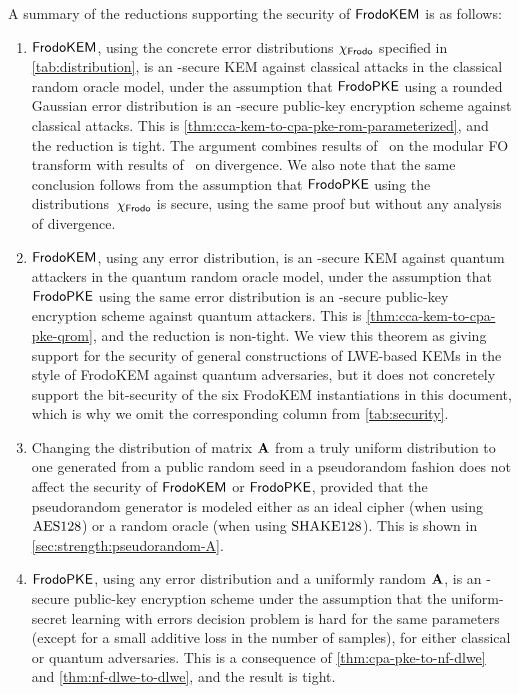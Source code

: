 \documentclass{iacrcc}
\begin{document}
A summary of the reductions supporting the security of $\textsf{\upshape\mdseries FrodoKEM}$ is
as follows:

\begin{enumerate}
\item $\textsf{\upshape\mdseries FrodoKEM}$, using the concrete error distributions
  $\chi_\textsf{\upshape\mdseries Frodo}$ specified in \autoref{tab:distribution}, is an
  \INDCCA-secure KEM against classical attacks in the classical random
  oracle model, under the assumption that $\textsf{\upshape\mdseries FrodoPKE}$ using a rounded
  Gaussian error distribution is an \INDCPA-secure public-key
  encryption scheme against classical attacks.  This is
  \autoref{thm:cca-kem-to-cpa-pke-rom-parameterized}, and the
  reduction is tight.  The argument combines results
  of~\cite{TCC:HofHovKil17} on the modular FO transform with results
  of~\cite{EC:LanSteSte14} on \renyi divergence. We also note that the
  same conclusion follows from the assumption that $\textsf{\upshape\mdseries FrodoPKE}$ using
  the distributions~$\chi_{\textsf{\upshape\mdseries Frodo}}$ is \INDCPA secure, using the same
  proof but without any analysis of \renyi divergence.

\item $\textsf{\upshape\mdseries FrodoKEM}$, using any error distribution, is an \INDCCA-secure
  KEM against quantum attackers in the quantum random oracle model,
  under the assumption that $\textsf{\upshape\mdseries FrodoPKE}$ using the same error
  distribution is an \OWCPA-secure public-key encryption scheme
  against quantum attackers.  This is
  \autoref{thm:cca-kem-to-cpa-pke-qrom}, and the reduction is
  non-tight.  We view this theorem as giving support for the security
  of general constructions of LWE-based KEMs in the style of FrodoKEM
  against quantum adversaries, but it does not concretely support the
  bit-security of the six FrodoKEM instantiations in this document,
  which is why we omit the corresponding column from
  \autoref{tab:security}.

\item Changing the distribution of matrix $\mathbf{A}$ from a truly uniform
  distribution to one generated from a public random seed in a
  pseudorandom fashion does not affect the security of $\textsf{\upshape\mdseries FrodoKEM}$ or
  $\textsf{\upshape\mdseries FrodoPKE}$, provided that the pseudorandom generator is modeled
  either as an ideal cipher (when using $\textrm{\upshape\mdseries AES128}$) or a random
  oracle (when using $\textrm{\upshape\mdseries SHAKE}128$). This is shown in
  \autoref{sec:strength:pseudorandom-A}.

\item $\textsf{\upshape\mdseries FrodoPKE}$, using any error distribution and a uniformly random
  $\mathbf{A}$, is an \INDCPA-secure public-key encryption scheme under the
  assumption that the uniform-secret learning with errors decision
  problem is hard for the same parameters (except for a small additive
  loss in the number of samples), for either classical or quantum
  adversaries.  This is a consequence of
  \autoref{thm:cpa-pke-to-nf-dlwe} and \autoref{thm:nf-dlwe-to-dlwe},
  and the result is tight.


\end{enumerate}
\end{document}
